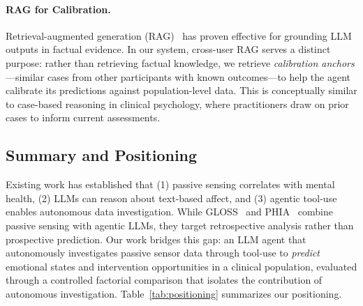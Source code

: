 \documentclass[screen,review,anonymous]{acmart}
\begin{document}
\paragraph{RAG for Calibration.}
Retrieval-augmented generation (RAG)~\cite{lewis2020rag, gao2024rag_survey} has proven effective for grounding LLM outputs in factual evidence. In our system, cross-user RAG serves a distinct purpose: rather than retrieving factual knowledge, we retrieve \emph{calibration anchors}---similar cases from other participants with known outcomes---to help the agent calibrate its predictions against population-level data. This is conceptually similar to case-based reasoning in clinical psychology, where practitioners draw on prior cases to inform current assessments.

\subsection{Summary and Positioning}

Existing work has established that (1) passive sensing correlates with mental health, (2) LLMs can reason about text-based affect, and (3) agentic tool-use enables autonomous data investigation. While GLOSS~\cite{min2025gloss} and PHIA~\cite{merrill2025phia} combine passive sensing with agentic LLMs, they target retrospective analysis rather than prospective prediction. Our work bridges this gap: an LLM agent that autonomously investigates passive sensor data through tool-use to \emph{predict} emotional states and intervention opportunities in a clinical population, evaluated through a controlled factorial comparison that isolates the contribution of autonomous investigation. Table~\ref{tab:positioning} summarizes our positioning.
\end{document}
